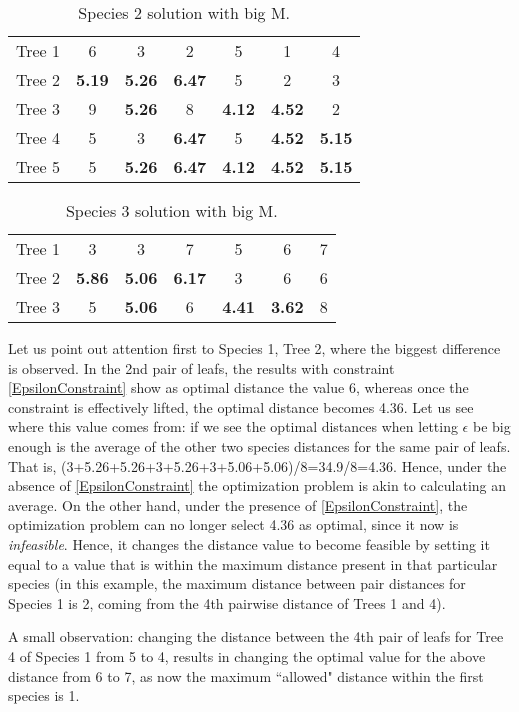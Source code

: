 \documentclass[12pt]{amsart}
\begin{document}
\begin{table}[h]
\caption{Species 2 solution with big M. \label{bigM2}}
\begin{tabular}{l|cccccc}
Tree 1&6& 3& 2& 5& 1& 4\\
Tree 2&\textbf{5.19}& \textbf{5.26}& \textbf{6.47}& 5& 2& 3\\
Tree 3&9& \textbf{5.26}& 8& \textbf{4.12}& \textbf{4.52}& 2\\
Tree 4&5& 3& \textbf{6.47}& 5&  \textbf{4.52}& \textbf{5.15}\\
Tree 5&5& \textbf{5.26}& \textbf{6.47}& \textbf{4.12}& \textbf{4.52}& \textbf{5.15} 
\end{tabular}
\end{table}

\begin{table}[h]
\caption{Species 3 solution with big M. \label{bigM3}}
\begin{tabular}{l|cccccc}
Tree 1&3& 3& 7& 5& 6& 7\\
Tree 2&\textbf{5.86}& \textbf{5.06}& \textbf{6.17}& 3& 6& 6\\
Tree 3&5& \textbf{5.06}& 6& \textbf{4.41}& \textbf{3.62}& 8
\end{tabular}
\end{table}

Let us point out attention first to Species 1, Tree 2, where the biggest difference is observed. In the 2nd pair of leafs, the results with constraint \eqref{EpsilonConstraint} show as optimal distance the value 6, whereas once the constraint is effectively lifted, the optimal distance becomes 4.36. Let us see where this value comes from: if we see the optimal distances when letting $\epsilon$ be big enough is the average of the other two species distances for the same pair of leafs. That is, (3+5.26+5.26+3+5.26+3+5.06+5.06)/8=34.9/8=4.36. Hence, under the absence of \eqref{EpsilonConstraint} the optimization problem is akin to calculating an average. On the other hand, under the presence of \eqref{EpsilonConstraint}, the optimization problem can no longer select 4.36 as optimal, since it now is \emph{infeasible}. Hence, it changes the distance value to become feasible by setting it equal to a value that is within the maximum distance present in that particular species (in this example, the maximum distance between pair distances for Species 1 is 2, coming from the 4th pairwise distance of Trees 1 and 4). 

A small observation: changing the distance between the 4th pair of leafs for Tree 4 of Species 1 from 5 to 4, results in changing the optimal value for the above distance from 6 to 7, as now the maximum ``allowed" distance within the first species is 1.  
\end{document}
